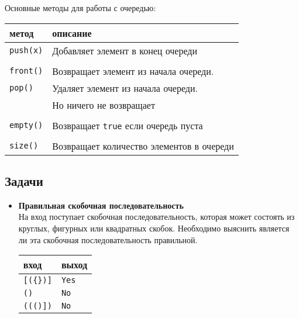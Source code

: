 \documentclass{article}
\begin{document}
Основные методы для работы с очередью:

\begin{tabular}{ l | l }
 метод & описание \\ \hline
 \texttt{push(x)}  & Добавляет элемент в конец очереди\\ \\\hline
 \texttt{front()}  & Возвращает элемент из начала очереди.  \\  \hline
 \texttt{pop()}    & Удаляет элемент из начала очереди. \\
                   & Но ничего не возвращает\\ \\ \hline
 \texttt{empty()}  & Возвращает \texttt{true} если очередь пуста \\ \\\hline
 \texttt{size()}   & Возвращает количество элементов в очереди \\ \hline
\end{tabular}

\subsection*{Задачи}
\begin{itemize}
\item \textbf{Правильная скобочная последовательность} \\
На вход поступает скобочная последовательность, которая может состоять из круглых, фигурных или квадратных скобок. Необходимо выяснить является ли эта скобочная последовательность правильной.
\begin{center}
\begin{tabular}{ l | l }
 вход & выход \\ \hline
 \texttt{[(\{\})]} & \texttt{Yes}  \\ 
 \texttt{({)}} & \texttt{No}  \\ 
 \texttt{((()])} & \texttt{No} \\
\end{tabular}
\end{center}
\end{itemize}
\fi
\end{document}

